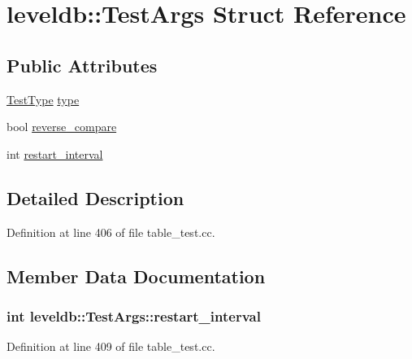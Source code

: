 \hypertarget{structleveldb_1_1_test_args}{}\section{leveldb\+:\+:Test\+Args Struct Reference}
\label{structleveldb_1_1_test_args}
\subsection*{Public Attributes}
\begin{DoxyCompactItemize}
\item 
\hyperlink{namespaceleveldb_aefcb8349b9101fe6eeff98a1682f1342}{Test\+Type} \hyperlink{structleveldb_1_1_test_args_a1c2c14e2506bf6c238a2685c38eb16ac}{type}
\item 
bool \hyperlink{structleveldb_1_1_test_args_ab4c8bef944a4ddf845378f1fce2b6c22}{reverse\+\_\+compare}
\item 
int \hyperlink{structleveldb_1_1_test_args_a233f5e5e56ff872e26f543585824df1d}{restart\+\_\+interval}
\end{DoxyCompactItemize}


\subsection{Detailed Description}


Definition at line 406 of file table\+\_\+test.\+cc.



\subsection{Member Data Documentation}
\hypertarget{structleveldb_1_1_test_args_a233f5e5e56ff872e26f543585824df1d}{}
\subsubsection[{restart\+\_\+interval}]{\setlength{\rightskip}{0pt plus 5cm}int leveldb\+::\+Test\+Args\+::restart\+\_\+interval}\label{structleveldb_1_1_test_args_a233f5e5e56ff872e26f543585824df1d}


Definition at line 409 of file table\+\_\+test.\+cc.

\hypertarget{structleveldb_1_1_test_args_ab4c8bef944a4ddf845378f1fce2b6c22}{}
